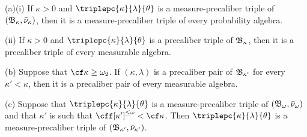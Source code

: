  (a)(i) If $\kappa>0$ and
$\triplepc{\kappa}{\lambda}{\theta}$
is a measure-precaliber triple of $(\frak B_{\kappa},\bar\nu_{\kappa})$,
then it is a measure-precaliber triple of every probability algebra.

\quad(ii) If $\kappa>0$ and $\triplepc{\kappa}{\lambda}{\theta}$
is a precaliber triple of $\frak B_{\kappa}$, then it is a precaliber
triple of every measurable algebra.

(b) Suppose that $\cf\kappa\ge\omega_2$.   If $(\kappa,\lambda)$
is a precaliber pair of
$\frak B_{\kappa'}$ for every $\kappa'<\kappa$, then it is a precaliber
pair of every measurable algebra.

(c) Suppose that $\triplepc{\kappa}{\lambda}{\theta}$ is a
measure-precaliber triple of
$(\frak B_{\omega},\bar\nu_{\omega})$ and that $\kappa'$ is such that
$\cff[\kappa']^{\le\omega}<\cf\kappa$.   Then
$\triplepc{\kappa}{\lambda}{\theta}$
is a measure-precaliber triple of
$(\frak B_{\kappa'},\bar\nu_{\kappa'})$.

